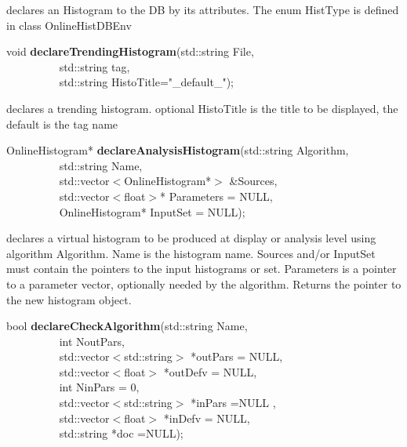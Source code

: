  declares an Histogram to the DB by its attributes.  The enum HistType is defined in class OnlineHistDBEnv


\item    void {\bf declareTrendingHistogram}(std::string File,\\\mbox{}~~~~~~~~~
                                std::string tag,\\\mbox{}~~~~~~~~~
                                std::string HistoTitle="\_default\_");

 declares a trending histogram. optional HistoTitle is the title to be displayed, the default is the tag name


\item    OnlineHistogram* {\bf declareAnalysisHistogram}(std::string Algorithm,\\\mbox{}~~~~~~~~~
                                            std::string Name,\\\mbox{}~~~~~~~~~
                                            std::vector$<$OnlineHistogram*$>$ \&Sources,\\\mbox{}~~~~~~~~~
                                            std::vector$<$float$>$* Parameters = NULL,\\\mbox{}~~~~~~~~~
                                            OnlineHistogram* InputSet = NULL);

 declares a virtual histogram to be produced at display or analysis
 level using algorithm Algorithm. Name is the histogram name. Sources
 and/or InputSet must contain the pointers to the input histograms or set. 
 Parameters is a
 pointer to a parameter vector, optionally needed by the algorithm. 
 Returns the pointer to the new histogram object.


\item    bool {\bf declareCheckAlgorithm}(std::string Name,\\\mbox{}~~~~~~~~~ 
                             int NoutPars,\\\mbox{}~~~~~~~~~ 
                             std::vector$<$std::string$>$ *outPars = NULL,\\\mbox{}~~~~~~~~~
                             std::vector$<$float$>$ *outDefv = NULL,\\\mbox{}~~~~~~~~~
                             int NinPars = 0,\\\mbox{}~~~~~~~~~ 
                             std::vector$<$std::string$>$ *inPars =NULL ,\\\mbox{}~~~~~~~~~
                             std::vector$<$float$>$ *inDefv = NULL,\\\mbox{}~~~~~~~~~
                             std::string *doc =NULL);


